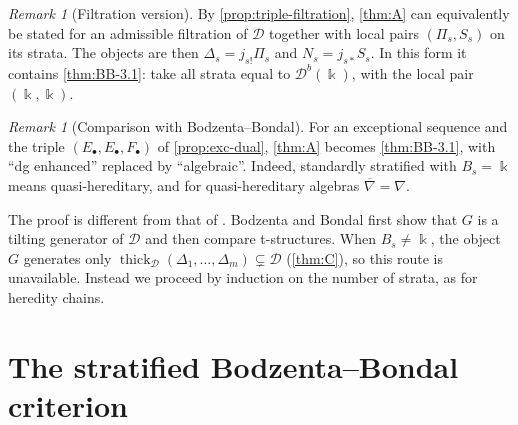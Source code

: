 \documentclass[11pt,reqno]{amsart}
\theoremstyle{plain}
\theoremstyle{definition}
\theoremstyle{remark}
\newtheorem{remark}[theorem]{Remark}
\newcommand{\kk}{\Bbbk}
\newcommand{\Db}{\mathcal{D}^b}
\newcommand{\thick}[2][\cD]{\operatorname{thick}_{#1}(#2)}
\newcommand{\nablabar}{\overline{\nabla}}
\newcommand{\cD}{\mathcal{D}}
\begin{document}
\begin{remark}[Filtration version]\label{rem:A-filtration}
By \cref{prop:triple-filtration}, \cref{thm:A} can equivalently be stated for an admissible filtration of $\cD$ together with local pairs $(\Pi_s,S_s)$ on its strata. The objects are then $\Delta_s=j_{s!}\Pi_s$ and $N_s=j_{s*}S_s$. In this form it contains \cref{thm:BB-3.1}: take all strata equal to $\Db(\kk)$, with the local pair $(\kk,\kk)$.
\end{remark}

\begin{remark}[Comparison with Bodzenta--Bondal]\label{rem:compare-BB}
For an exceptional sequence and the triple $(E_\bullet,E_\bullet,F_\bullet)$ of \cref{prop:exc-dual}, \cref{thm:A} becomes \cref{thm:BB-3.1}, with ``dg enhanced'' replaced by ``algebraic''. Indeed, standardly stratified with $B_s=\kk$ means quasi-hereditary, and for quasi-hereditary algebras $\nablabar=\nabla$.

The proof is different from that of \cite{BB26}. Bodzenta and Bondal first show that $G$ is a tilting generator of $\cD$ and then compare t-structures. When $B_s\neq\kk$, the object $G$ generates only $\thick{\Delta_1,\dots,\Delta_m}\subsetneq\cD$ (\cref{thm:C}), so this route is unavailable. Instead we proceed by induction on the number of strata, as for heredity chains.
\end{remark}

\section{The stratified Bodzenta--Bondal criterion}\label{sec:criterion}
\end{document}
